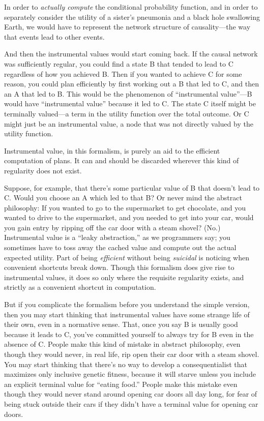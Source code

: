 {
 In order to \textit{actually compute} the conditional probability
function, and in order to separately consider the utility of a
sister's pneumonia and a black hole swallowing Earth,
we would have to represent the network structure of causality---the way
that events lead to other events.}

{
 And then the instrumental values would start coming back. If the
causal network was sufficiently regular, you could find a state B that
tended to lead to C regardless of how you achieved B. Then if you
wanted to achieve C for some reason, you could plan efficiently by
first working out a B that led to C, and then an A that led to B. This
would be the phenomenon of ``instrumental
value''---B would have
``instrumental value'' because it
led to C. The state C itself might be terminally valued---a term in the
utility function over the total outcome. Or C might just be an
instrumental value, a node that was not directly valued by the utility
function.}

{
 Instrumental value, in this formalism, is purely an aid to the
efficient computation of plans. It can and should be discarded wherever
this kind of regularity does not exist.}

{
 Suppose, for example, that there's some particular
value of B that doesn't lead to C. Would you choose an
A which led to that B? Or never mind the abstract philosophy: If you
wanted to go to the supermarket to get chocolate, and you wanted to
drive to the supermarket, and you needed to get into your car, would
you gain entry by ripping off the car door with a steam shovel? (No.)
Instrumental value is a ``leaky
abstraction,'' as we programmers say; you sometimes
have to toss away the cached value and compute out the actual expected
utility. Part of being \textit{efficient} without being
\textit{suicidal} is noticing when convenient shortcuts break down.
Though this formalism does give rise to instrumental values, it does so
only where the requisite regularity exists, and strictly as a
convenient shortcut in computation.}

{
 But if you complicate the formalism before you understand the
simple version, then you may start thinking that instrumental values
have some strange life of their own, even in a normative sense. That,
once you say B is usually good because it leads to C,
you've committed yourself to always try for B even in
the absence of C. People make this kind of mistake in abstract
philosophy, even though they would never, in real life, rip open their
car door with a steam shovel. You may start thinking that
there's no way to develop a consequentialist that
maximizes only inclusive genetic fitness, because it will starve unless
you include an explicit terminal value for ``eating
food.'' People make this mistake even though they
would never stand around opening car doors all day long, for fear of
being stuck outside their cars if they didn't have a
terminal value for opening car doors.}

